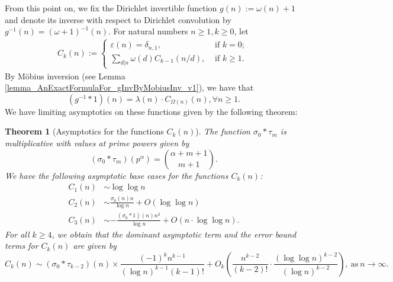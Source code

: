 \documentclass[11pt,reqno,a4letter]{article}
\numberwithin{figure}{section}
\numberwithin{table}{section}
\theoremstyle{plain}
\newtheorem{theorem}{Theorem}
\numberwithin{theorem}{section}
\theoremstyle{definition}
\begin{document}
From this point on, we fix the Dirichlet invertible function $g(n) := \omega(n) + 1$ and denote its 
inverse with respect to Dirichlet convolution by $g^{-1}(n) = (\omega+1)^{-1}(n)$. 
For natural numbers $n \geq 1, k \geq 0$, let 
\begin{align*} 
C_k(n) := \begin{cases} 
     \varepsilon(n) = \delta_{n,1}, & \text{ if $k = 0$; } \\ 
     \sum\limits_{d|n} \omega(d) C_{k-1}(n/d), & \text{ if $k \geq 1$. } 
     \end{cases} 
\end{align*} 
By M\"obius inversion (see Lemma \ref{lemma_AnExactFormulaFor_gInvByMobiusInv_v1}), 
we have that 
\begin{equation} 
\label{eqn_AnExactFormulaFor_gInvByMobiusInv_v1} 
(g^{-1} \ast 1)(n) = \lambda(n) \cdot C_{\Omega(n)}(n), \forall n \geq 1. 
\end{equation} 
We have limiting asymptotics on these functions given by the following theorem: 

\begin{theorem}[Asymptotics for the functions $C_k(n)$] 
\label{theorem_Ckn_GeneralAsymptoticsForms} 
The function $\sigma_0 \ast \tau_m$ is multiplicative with values at prime powers 
given by 
\begin{equation} 
\label{eqn_dnTaumCvl_binomCoeffFormulaAtPrimePowers} 
(\sigma_0 \ast \tau_m)(p^{\alpha}) = \binom{\alpha+m+1}{m+1}. 
\end{equation} 
We have the following asymptotic base cases for the functions $C_k(n)$: 
\begin{align*} 
C_1(n) & \sim \log\log n \\ 
C_2(n) & \sim \frac{\sigma_0(n) n}{\log n} + O(\log\log n) \\ 
C_3(n) & \sim -\frac{(\sigma_0 \ast 1)(n) n^2}{\log n} + 
     O\left(n \cdot \log\log n\right). 
\end{align*} 
For all $k \geq 4$, we obtain that the dominant asymptotic term and the error bound terms for 
$C_k(n)$ are given by 
\[
C_k(n) \sim (\sigma_0 \ast \tau_{k-2})(n) \times \frac{(-1)^{k} n^{k-1}}{(\log n)^{k-1} (k-1)!} + 
     O_k\left(\frac{n^{k-2}}{(k-2)!} \cdot \frac{(\log\log n)^{k-2}}{(\log n)^{k-2}}\right), 
     \mathrm{\ as\ }n \rightarrow \infty. 
\]
\end{theorem} 
\end{document}
